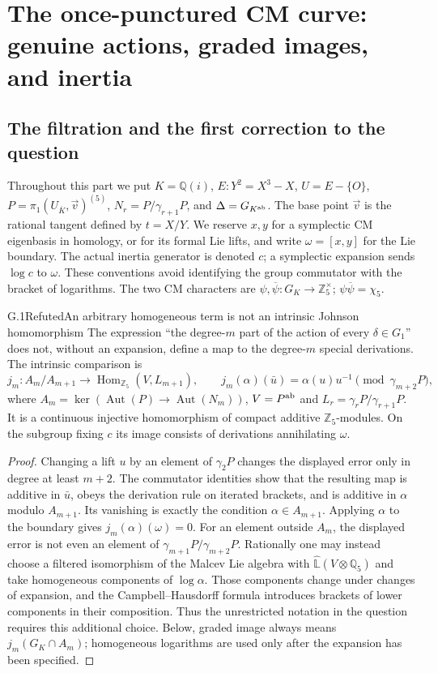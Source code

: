 \section{The once-punctured CM curve: genuine actions, graded images, and inertia}
\label{sec:G}

\subsection{The filtration and the first correction to the question}

Throughout this part we put $K=\mathbb Q(i)$, $E:Y^2=X^3-X$,
$U=E-\{O\}$, $P=\pi_1(U_{\overline K},\vec v)^{(5)}$,
$N_r=P/\gamma_{r+1}P$, and $\Delta=G_{K^{\rm ab}}$.
The base point $\vec v$ is the rational tangent defined by $t=X/Y$.
We reserve $x,y$ for a symplectic CM eigenbasis in homology, or for its
formal Lie lifts, and write $\omega=[x,y]$ for the Lie boundary. The actual
inertia generator is denoted $c$; a symplectic expansion sends
$\log c$ to $\omega$. These conventions avoid identifying the group
commutator with the bracket of logarithms. The two CM characters are
$\psi,\overline\psi:G_K\longrightarrow\mathbb Z_5^\times$;
$\psi\overline\psi=\chi_5$.

\begin{statement}{G.1}{Refuted}{An arbitrary homogeneous term is not an intrinsic Johnson homomorphism}
The expression ``the degree-$m$ part of the action of every
$\delta\in G_1$'' does not, without an expansion, define a map to the
degree-$m$ special derivations. The intrinsic comparison is
\[
 j_m:A_m/A_{m+1}\longrightarrow
 \operatorname{Hom}_{\mathbb Z_5}(V,L_{m+1}),\qquad
 j_m(\alpha)(\bar u)=\alpha(u)u^{-1}\pmod{\gamma_{m+2}P},
\]
where $A_m=\ker(\operatorname{Aut}(P)\to\operatorname{Aut}(N_m))$,
$V=P^{\rm ab}$ and $L_r=\gamma_rP/\gamma_{r+1}P$.
It is a continuous injective homomorphism of compact additive
$\mathbb Z_5$-modules. On the subgroup fixing $c$ its image consists of
derivations annihilating $\omega$.
\end{statement}
\begin{proof}
Changing a lift $u$ by an element of $\gamma_2P$ changes the displayed
error only in degree at least $m+2$. The commutator identities show that
the resulting map is additive in $\bar u$, obeys the derivation rule on
iterated brackets, and is additive in $\alpha$ modulo $A_{m+1}$.
Its vanishing is exactly the condition $\alpha\in A_{m+1}$. Applying
$\alpha$ to the boundary gives $j_m(\alpha)(\omega)=0$.
For an element outside $A_m$, the displayed error is not even an element
of $\gamma_{m+1}P/\gamma_{m+2}P$. Rationally one may instead choose a
filtered isomorphism of the Malcev Lie algebra with
$\widehat{\mathbb L}(V\otimes\mathbb Q_5)$ and take homogeneous
components of $\log\alpha$. Those components change under changes of
expansion, and the Campbell--Hausdorff formula introduces brackets of
lower components in their composition. Thus the unrestricted notation
in the question requires this additional choice. Below, graded image
always means $j_m(G_K\cap A_m)$; homogeneous logarithms are used only
after the expansion has been specified.
\end{proof}

